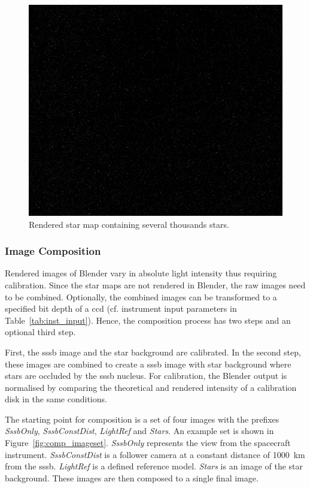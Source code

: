 \begin{figure}[htb]
    \centering
    \includegraphics[width=\textwidth]{doc/thesis/0_figures/star_rendering/Stars_2017-08-15T115856-171000.png}
    \caption{Rendered star map containing several thousands stars.}
    \label{fig:star_rendering}
\end{figure}

\subsubsection{Image Composition} \label{sec:composition}
Rendered images of Blender vary in absolute light intensity thus requiring calibration. Since the star maps are not rendered in Blender, the raw images need to be combined. Optionally, the combined images can be transformed to a specified bit depth of a \gls{ccd} (cf. instrument input parameters in Table~\ref{tab:inst_input}). Hence, the composition process has two steps and an optional third step. 

First, the \gls{sssb} image and the star background are calibrated. In the second step, these images are combined to create a \gls{sssb} image with star background where stars are occluded by the \gls{sssb} nucleus. For calibration, the Blender output is normalised by comparing the theoretical and rendered intensity of a calibration disk in the same conditions.

The starting point for composition is a set of four images with the prefixes \textit{SssbOnly}, \textit{SssbConstDist}, \textit{LightRef} and \textit{Stars}. An example set is shown in Figure~\ref{fig:comp_imageset}. \textit{SssbOnly} represents the view from the spacecraft instrument. \textit{SssbConstDist} is a follower camera at a constant distance of \SI{1000}{\kilo\meter} from the \gls{sssb}. \textit{LightRef} is a defined reference model. \textit{Stars} is an image of the star background. These images are then composed to a single final image.

